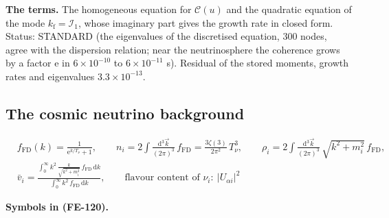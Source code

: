 \documentclass[
  10pt,
]{article}
\begin{document}
\textbf{The terms.} The homogeneous equation for \(\mathcal{C}(u)\) and
the quadratic equation of the mode \(k_{\mathrm{f}} = \mathcal{I}_1\),
whose imaginary part gives the growth rate in closed form. Status:
STANDARD (the eigenvalues of the discretised equation, 300 nodes, agree
with the dispersion relation; near the neutrinosphere the coherence
grows by a factor \(\mathrm{e}\) in \(6\times10^{-10}\) to
\(6\times10^{-11}\) s). Residual of the stored moments, growth rates and
eigenvalues \(3.3\times10^{-13}\).

\hypertarget{the-cosmic-neutrino-background}{%
\subsection{The cosmic neutrino
background}\label{the-cosmic-neutrino-background}}

\[
\begin{aligned}
&f_{\mathrm{FD}}(k) = \frac{1}{\mathrm{e}^{k/T_\nu} + 1},\qquad
 n_i = 2\int\frac{\mathrm{d}^3\vec k}{(2\pi)^3}\,f_{\mathrm{FD}} = \frac{3\zeta(3)}{2\pi^2}\,T_\nu^3,\qquad
 \rho_i = 2\int\frac{\mathrm{d}^3\vec k}{(2\pi)^3}\,\sqrt{k^2 + m_i^2}\,f_{\mathrm{FD}},\\
&\bar v_i = \frac{\int_0^\infty k^2\,\frac{k}{\sqrt{k^2 +
 m_i^2}}\,f_{\mathrm{FD}}\,\mathrm{d}k}{\int_0^\infty k^2\,f_{\mathrm{FD}}\,\mathrm{d}k},
 \qquad \text{flavour content of }\nu_i:\ \lvert U_{\alpha i}\rvert^2
\end{aligned} \tag{FE-120}
\]

\textbf{Symbols in (FE-120).}
\end{document}
